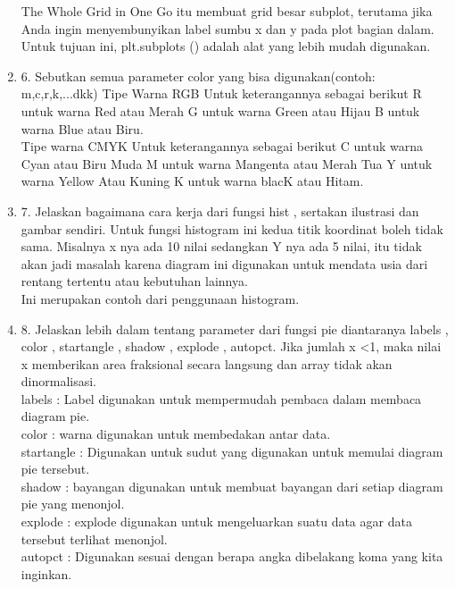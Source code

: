 \begin{enumerate}
The Whole Grid in One Go itu  membuat grid besar subplot, terutama jika Anda ingin menyembunyikan label sumbu x dan y pada plot bagian dalam. Untuk tujuan ini, plt.subplots () adalah alat yang lebih mudah digunakan.\\
 
\item 6. Sebutkan semua parameter color yang bisa digunakan(contoh: m,c,r,k,...dkk)
Tipe Warna RGB
    Untuk keterangannya sebagai berikut
    R untuk warna Red atau Merah
    G untuk warna Green atau Hijau
    B untuk warna Blue atau Biru.\\
    
Tipe warna CMYK
    Untuk keterangannya sebagai berikut
    C untuk warna Cyan atau Biru Muda
    M untuk warna Mangenta atau Merah Tua
    Y untuk warna Yellow Atau Kuning
    K untuk warna blacK atau Hitam.\\

\item 7. Jelaskan bagaimana cara kerja dari fungsi hist , sertakan ilustrasi dan gambar sendiri.
Untuk fungsi histogram ini kedua titik koordinat boleh tidak sama. Misalnya x nya ada 10 nilai sedangkan Y nya ada 5 nilai, itu tidak akan jadi masalah karena diagram ini digunakan untuk mendata usia dari rentang tertentu atau kebutuhan lainnya.\\

Ini merupakan contoh dari penggunaan histogram.\\

\item 8. Jelaskan lebih dalam tentang parameter dari fungsi pie diantaranya labels , color , startangle , shadow , explode , autopct.
Jika jumlah x <1, maka nilai x memberikan area fraksional secara langsung dan array tidak akan dinormalisasi.\\

labels : Label digunakan untuk mempermudah pembaca dalam membaca diagram pie.\\

color : warna digunakan untuk membedakan antar data.\\

startangle : Digunakan untuk sudut yang digunakan untuk memulai diagram pie tersebut.\\

shadow :  bayangan digunakan untuk membuat bayangan dari setiap diagram pie yang menonjol.\\

explode : explode digunakan untuk mengeluarkan suatu data agar data tersebut terlihat menonjol.\\

autopct : Digunakan sesuai dengan berapa angka dibelakang koma yang kita inginkan.\\

\end{enumerate}
